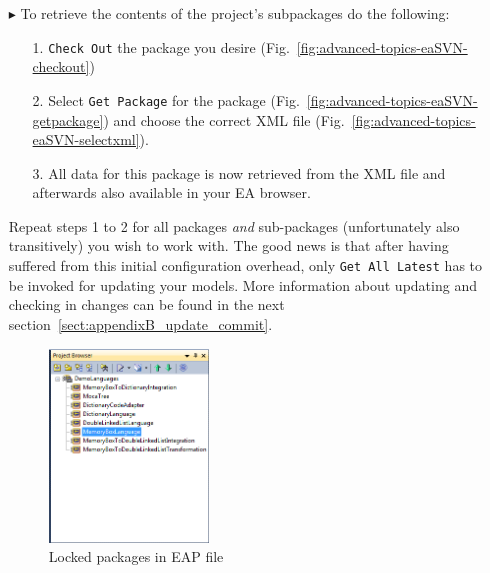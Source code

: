 \begin{enumerate}
\item[$\blacktriangleright$] To retrieve the contents of the project's subpackages do the following:
\begin{enumerate}
\item[1.] \texttt{Check Out} the package you desire (Fig.~\ref{fig:advanced-topics-eaSVN-checkout})
\item[2.] Select \texttt{Get Package} for the package (Fig.~\ref{fig:advanced-topics-eaSVN-getpackage}) and choose the correct XML file (Fig.~\ref{fig:advanced-topics-eaSVN-selectxml}).
\item[3.] All data for this package is now retrieved from the XML file and afterwards also available in your EA browser.
\end{enumerate}
Repeat steps 1 to 2 for all packages \emph{and} sub-packages (unfortunately also transitively) you wish to work with. The good news is that after having suffered from this initial configuration overhead, only \texttt{Get All Latest} has to be invoked for updating your models. More information about updating and checking in changes can be found in the next section~\ref{sect:appendixB_update_commit}. 
\begin{figure}[htbp]
\begin{center}
	\includegraphics[width=0.4\textwidth]{pics/advancedTopics/eaSVN/DemoLanguages/006.png}
	\caption{Locked packages in EAP file}
  	\label{fig:advanced-topics-eaSVN-locked}
\end{center}
\end{figure}


\end{enumerate}
